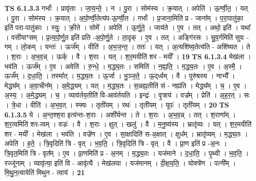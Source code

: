 \documentclass[17pt]{extarticle}
\begin{document}
                  \newline
                                \textbf{ TS 6.1.3.3} \newline
                  गर्भाः᳚ । प्रावृ॑ताः । जा॒य॒न्ते॒ । न । पु॒रा । सोम॑स्य । क्र॒यात् । अपेति॑ । ऊ॒र्ण्वी॒त॒ । यत् । पु॒रा । सोम॑स्य । क्र॒यात् । अ॒पो॒र्ण्वी॒तेत्य॑प-ऊ॒र्ण्वी॒त । गर्भाः᳚ । प्र॒जाना॒मिति॑ प्र - जाना᳚म् । प॒रा॒पातु॑का॒ इति॑ परा-पातु॑काः । स्युः॒ । क्री॒ते । सोमे᳚ । अपेति॑ । ऊ॒र्णु॒ते॒ । जाय॑ते । ए॒व । तत् । अथो॒ इति॑ । यथा᳚ । वसी॑याꣳसम् । प्र॒त्य॒पो॒र्णु॒त इति॑ प्रति -अ॒पो॒र्णु॒ते । ता॒दृक् । ए॒व । तत् । अङ्गि॑रसः । सु॒व॒र्गमिति॑ सुवः - गम् । लो॒कम् । यन्तः॑ । ऊर्ज᳚म् । वीति॑ । अ॒भ॒ज॒न्त॒ । ततः॑ । यत् । अ॒त्यशि॑ष्य॒तेत्य॑ति - अशि॑ष्यत । ते । श॒राः । अ॒भ॒व॒न्न् । ऊर्क् । वै । श॒राः । यत् । श॒र॒मयीति॑ शर - मयी᳚ । \textbf{  19} \newline
                  \newline
                                \textbf{ TS 6.1.3.4} \newline
                  मेख॑ला । भव॑ति । ऊर्ज᳚म् । ए॒व । अवेति॑ । रु॒न्धे॒ । म॒द्ध्य॒तः । समिति॑ । न॒ह्य॒ति॒ । म॒द्ध्य॒तः । ए॒व । अ॒स्मै॒ । ऊर्ज᳚म् । द॒धा॒ति॒ । तस्मा᳚त् । म॒द्ध्य॒तः । ऊ॒र्जा । भु॒ञ्ज॒ते॒ । ऊ॒द्‌र्ध्वम् । वै । पुरु॑षस्य । नाभ्यै᳚ । मेद्ध्य᳚म् । अ॒वा॒चीन᳚म् । अ॒मे॒द्ध्यम् । यत् । म॒द्ध्य॒तः । स॒न्नह्य॒तीति॑ सं - नह्य॑ति । मेद्ध्य᳚म् । च॒ । ए॒व । अ॒स्य॒ । अ॒मे॒द्ध्यम् । च॒ । व्याव॑र्तय॒तीति॑ वि-आव॑र्तयति । इन्द्रः॑ । वृ॒त्राय॑ । वज्र᳚म् । प्रेति॑ । अ॒ह॒र॒त् । सः । त्रे॒धा । वीति॑ । अ॒भ॒व॒त् । स्फ्यः । तृती॑यम् । रथः॑ । तृती॑यम् । यूपः॑ । तृती॑यम् । \textbf{  20} \newline
                  \newline
                                \textbf{ TS 6.1.3.5} \newline
                  ये । अ॒न्त॒श्श॒रा इत्य॑न्तः-श॒राः । अशी᳚र्यन्त । ते । श॒राः । अ॒भ॒व॒न्न् । तत् । श॒राणा᳚म् । श॒र॒त्वमिति॑ शर-त्वम् । वज्रः॑ । वै । श॒राः । क्षुत् । खलु॑ । वै । म॒नु॒ष्य॑स्य । भ्रातृ॑व्यः । यत् । श॒र॒मयीति॑ शर - मयी᳚ । मेख॑ला । भव॑ति । वज्रे॑ण । ए॒व । सा॒क्षादिति॑ स-अ॒क्षात् । क्षुध᳚म् । भ्रातृ॑व्यम् । म॒द्ध्य॒तः । अपेति॑ । ह॒ते॒ । त्रि॒वृदिति॑ त्रि - वृत् । भ॒व॒ति॒ । त्रि॒वृदिति॑ त्रि - वृत् । वै । प्रा॒ण इति॑ प्र -अ॒नः । त्रि॒वृत॒मिति॑ त्रि - वृत᳚म् । ए॒व । प्रा॒णमिति॑ प्र - अ॒नम् । म॒द्ध्य॒तः । यज॑माने । द॒धा॒ति॒ । पृ॒थ्वी । भ॒व॒ति॒ । रज्जू॑नाम् । व्यावृ॑त्या॒ इति॑ वि - आवृ॑त्यै । मेख॑लया । यज॑मानम् । दी॒क्ष॒य॒ति॒ । योक्त्रे॑ण । पत्नी᳚म् । मि॒थु॒न॒त्वायेति॑ मिथुन - त्वाय॑ । \textbf{  21} \newline
                  \newline
\end{document}
